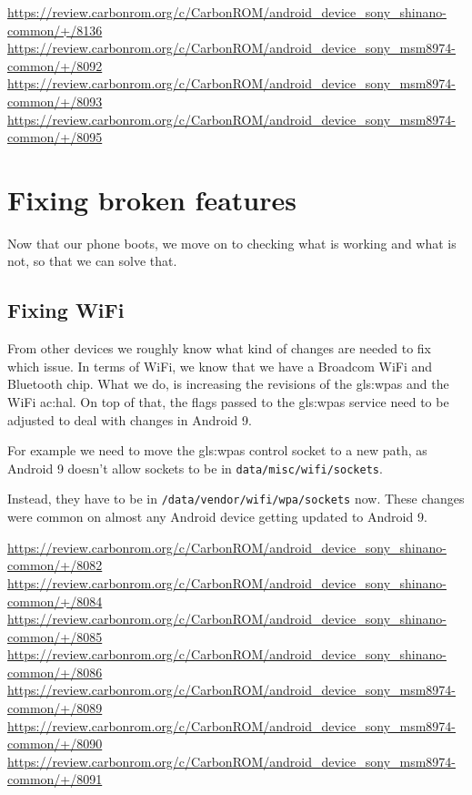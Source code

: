 \url{https://review.carbonrom.org/c/CarbonROM/android_device_sony_shinano-common/+/8136}\\
\url{https://review.carbonrom.org/c/CarbonROM/android_device_sony_msm8974-common/+/8092}\\
\url{https://review.carbonrom.org/c/CarbonROM/android_device_sony_msm8974-common/+/8093}\\
\url{https://review.carbonrom.org/c/CarbonROM/android_device_sony_msm8974-common/+/8095}

\section{Fixing broken features}
\label{ch:FixingFeatures}

Now that our phone boots, we move on to checking what is working and what is not, so that we can solve that.

\subsection{Fixing WiFi}

From other devices we roughly know what kind of changes are needed to fix which issue. In terms of WiFi, we know that we have a Broadcom WiFi and Bluetooth chip.
What we do, is increasing the revisions of the \gls{gls:wpas} and the WiFi \acrshort{ac:hal}.
On top of that, the flags passed to the \gls{gls:wpas} service need to be adjusted to deal with changes in Android 9.

For example we need to move the \gls{gls:wpas} control socket to a new path, as Android 9 doesn't allow sockets to be in \texttt{data/misc/wifi/sockets}.

Instead, they have to be in \texttt{/data/vendor/wifi/wpa/sockets} now. These changes were common on almost any Android device getting updated to Android 9.

\url{https://review.carbonrom.org/c/CarbonROM/android_device_sony_shinano-common/+/8082}\\
\url{https://review.carbonrom.org/c/CarbonROM/android_device_sony_shinano-common/+/8084}\\
\url{https://review.carbonrom.org/c/CarbonROM/android_device_sony_shinano-common/+/8085}\\
\url{https://review.carbonrom.org/c/CarbonROM/android_device_sony_shinano-common/+/8086}\\
\url{https://review.carbonrom.org/c/CarbonROM/android_device_sony_msm8974-common/+/8089}\\
\url{https://review.carbonrom.org/c/CarbonROM/android_device_sony_msm8974-common/+/8090}\\
\url{https://review.carbonrom.org/c/CarbonROM/android_device_sony_msm8974-common/+/8091}

